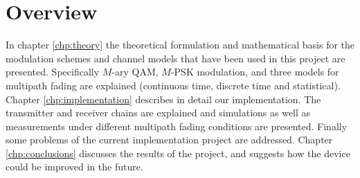 \section{Overview}

In chapter \ref{chp:theory} the theoretical formulation and mathematical basis for the modulation schemes and channel models that have been used in this project are presented. Specifically \(M\)-ary QAM, \(M\)-PSK modulation, and three models for multipath fading are explained (continuous time, discrete time and statistical). Chapter \ref{chp:implementation} describes in detail our implementation. The transmitter and receiver chains are explained and simulations as well as measurements under different multipath fading conditions are presented. Finally some problems of the current implementation project are addressed. Chapter \ref{chp:conclusions} discusses the results of the project, and suggests how the device could be improved in the future.
